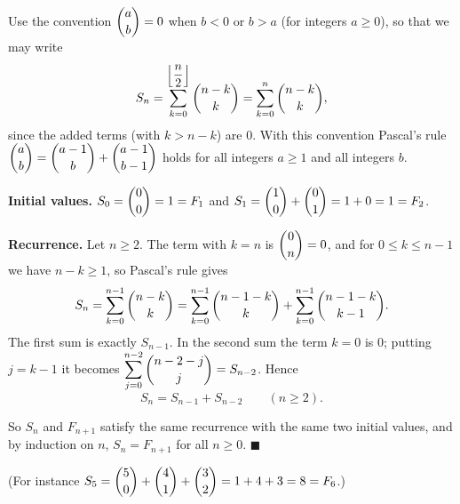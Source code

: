 Use the convention $\dbinom ab=0$ when $b<0$ or $b>a$ (for integers $a\ge0$), so that we may write
\[S_n=\sum_{k=0}^{\left\lfloor\dfrac n2\right\rfloor}\dbinom{n-k}{k}=\sum_{k=0}^{n}\dbinom{n-k}{k},\]
since the added terms (with $k>n-k$) are $0$. With this convention Pascal's rule $\dbinom ab=\dbinom{a-1}{b}+\dbinom{a-1}{b-1}$ holds for all integers $a\ge1$ and all integers $b$.

\textbf{Initial values.} $S_0=\dbinom00=1=F_1$ and $S_1=\dbinom10+\dbinom01=1+0=1=F_2$.

\textbf{Recurrence.} Let $n\ge2$. The term with $k=n$ is $\dbinom0n=0$, and for $0\le k\le n-1$ we have $n-k\ge1$, so Pascal's rule gives
\[S_n=\sum_{k=0}^{n-1}\dbinom{n-k}{k}=\sum_{k=0}^{n-1}\dbinom{n-1-k}{k}+\sum_{k=0}^{n-1}\dbinom{n-1-k}{k-1}.\]
The first sum is exactly $S_{n-1}$. In the second sum the term $k=0$ is $0$; putting $j=k-1$ it becomes $\displaystyle\sum_{j=0}^{n-2}\dbinom{n-2-j}{j}=S_{n-2}$. Hence
\[S_n=S_{n-1}+S_{n-2}\qquad(n\ge2).\]

So $S_n$ and $F_{n+1}$ satisfy the same recurrence with the same two initial values, and by induction on $n$, $S_n=F_{n+1}$ for all $n\ge0$. $\blacksquare$

(For instance $S_5=\dbinom50+\dbinom41+\dbinom32=1+4+3=8=F_6$.)
